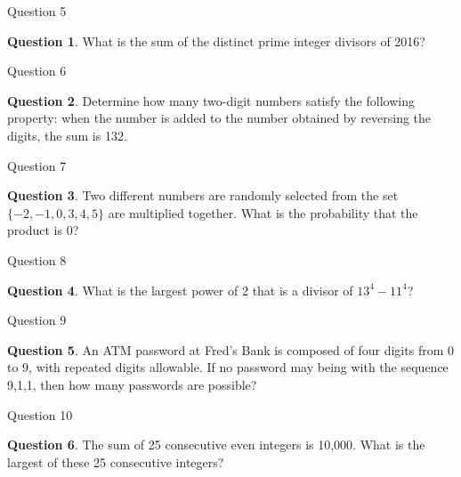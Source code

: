 \documentclass[handout]{beamer}
\theoremstyle{definition}
\newtheorem{quest}{Question}
\begin{document}
\begin{frame}{Question 5}
\begin{quest}
What is the sum of the distinct prime integer divisors of 2016?
\end{quest}

\end{frame}

\begin{frame}{Question 6}
\begin{quest}
Determine how many two-digit numbers satisfy the following property: when the number is added to the number obtained by reversing the digits, the sum is 132.
\end{quest}

\end{frame}

\begin{frame}{Question 7}
\begin{quest}
Two different numbers are randomly selected from the set $\{-2,-1,0,3,4,5\}$ are multiplied together.  What is the probability that the product is 0?
\end{quest}

\end{frame}

\begin{frame}{Question 8}
\begin{quest}
What is the largest power of 2 that is a divisor of $13^4-11^4$?
\end{quest}

\end{frame}

\begin{frame}{Question 9}
\begin{quest}
An ATM password at Fred's Bank is composed of four digits from 0 to 9, with repeated digits allowable.  If no password may being with the sequence 9,1,1, then how many passwords are possible?
\end{quest}

\end{frame}

\begin{frame}{Question 10}
\begin{quest}
The sum of 25 consecutive even integers is 10,000.  What is the largest of these 25 consecutive integers?
\end{quest}

\end{frame}
\end{document}
